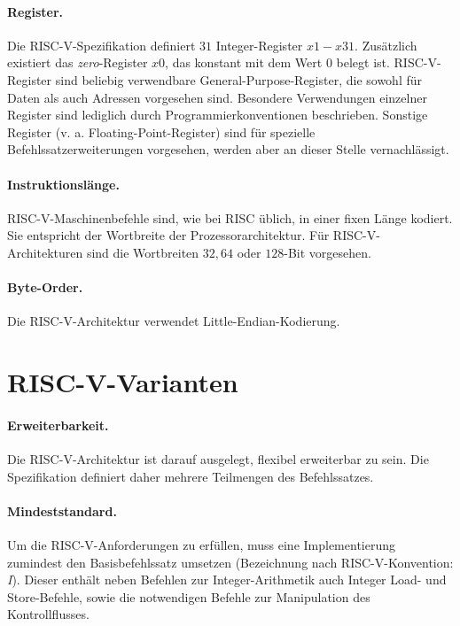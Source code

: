 \paragraph{Register.} Die RISC-V-Spezifikation definiert $31$
Integer-Register $x1 - x31$. Zusätzlich existiert das
\textit{zero}-Register $x0$, das konstant mit dem Wert $0$ belegt ist. RISC-V-Register sind beliebig verwendbare General-Purpose-Register, die sowohl für Daten als auch Adressen vorgesehen sind. Besondere Verwendungen einzelner Register sind lediglich durch Programmierkonventionen beschrieben. Sonstige Register (v. a. Floating-Point-Register) sind für spezielle Befehlssatzerweiterungen vorgesehen, werden aber an dieser Stelle vernachlässigt.

\paragraph{Instruktionslänge.} RISC-V-Maschinenbefehle sind, wie bei
RISC üblich, in einer fixen Länge kodiert. Sie entspricht der Wortbreite
der Prozessorarchitektur. Für RISC-V-Architekturen sind die Wortbreiten
$32, 64$ oder $128$-Bit vorgesehen.

\paragraph{Byte-Order.} Die RISC-V-Architektur verwendet Little-Endian-Kodierung.

\section{RISC-V-Varianten}
\label{sec:erweiterung}

\paragraph{Erweiterbarkeit.} Die RISC-V-Architektur ist darauf ausgelegt, flexibel erweiterbar zu sein. Die Spezifikation definiert daher mehrere Teilmengen des Befehlssatzes. \cite[p. 4]{RISC}

\paragraph{Mindeststandard.} Um die RISC-V-Anforderungen zu erfüllen,
muss eine Implementierung zumindest den Basisbefehlssatz umsetzen
(Bezeichnung nach \mbox{RISC-V}-Konvention: \textit{I}). Dieser enthält
neben Befehlen zur Integer-Arithmetik auch Integer Load- und Store-Befehle, sowie die notwendigen Befehle zur Manipulation des Kontrollflusses.

